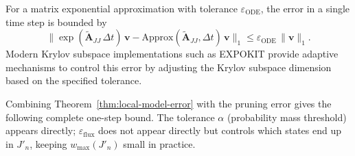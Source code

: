 \documentclass[onefignum,onetabnum]{siamart171218}
\begin{document}
\begin{proposition}
\label{prop:local_time_error}
For a matrix exponential approximation with tolerance $\varepsilon_{\mathrm{ODE}}$, the error in a single time step is bounded by
\begin{equation}
\|\exp(\widetilde{\mathbf{A}}_{JJ}\,\Delta t)\,\boldsymbol{v} - \mathrm{Approx}(\widetilde{\mathbf{A}}_{JJ}, \Delta t)\,\boldsymbol{v}\|_1 \le \varepsilon_{\mathrm{ODE}}\,\|\boldsymbol{v}\|_1.
\end{equation}
Modern Krylov subspace implementations such as EXPOKIT \cite{Sidje1998} provide adaptive mechanisms to control this error by adjusting the Krylov subspace dimension based on the specified tolerance.
\end{proposition}

Combining Theorem~\ref{thm:local-model-error} with the pruning error gives the following complete one-step bound.  The tolerance $\alpha$ (probability mass threshold) appears directly; $\varepsilon_{\mathrm{flux}}$ does not appear directly but controls which states end up in $J'_n$, keeping $w_{\max}(J'_n)$ small in practice.
\end{document}
